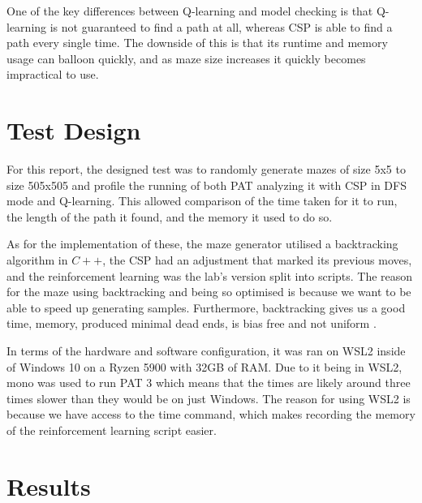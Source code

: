 \documentclass{article}
\newcommand\tab[1][1cm]{\hspace*{#1}}
\begin{document}
        \tab One of the key differences between Q-learning and model checking is 
        that Q-learning is not guaranteed to find a path at all, whereas CSP 
        is able to find a path every single time. The downside of this is 
        that its runtime and memory usage can balloon quickly, and as maze 
        size increases it quickly becomes impractical to use.

    \section{Test Design}\label{sec:test-design}
        For this report, the designed test was to randomly generate mazes of 
        size 5x5 to size 505x505 and profile the running of both PAT analyzing 
        it with CSP in DFS mode and Q-learning. This allowed comparison of 
        the time taken for it to run, the length of the path it found, and 
        the memory it used to do so.

        \tab As for the implementation of these, the maze generator utilised a
        backtracking algorithm in $C++$, the CSP had an adjustment that marked its
        previous moves, and the reinforcement learning was the lab's version
        split into scripts. The reason for the maze using backtracking and being
        so optimised is because we want to be able to speed up generating
        samples. Furthermore, backtracking gives us a good time, memory,
        produced minimal dead ends, is bias free and not uniform 
        \cite{source}.

        \tab In terms of the hardware and software configuration, it was ran on
        WSL2 inside of Windows 10 on a Ryzen 5900 with 32GB of RAM. Due to it
        being in WSL2, mono was used to run PAT 3 which means that the times are
        likely around three times slower than they would be on just Windows. 
        The reason for using WSL2 is because we have access to the time command,
        which makes recording the memory of the reinforcement learning script
        easier. 

    \section{Results}\label{sec:results}

        \begin{table}[ht!]
            \resizebox{\textwidth}{!}{
                
            }
        \end{table}
        \newpage
\end{document}
